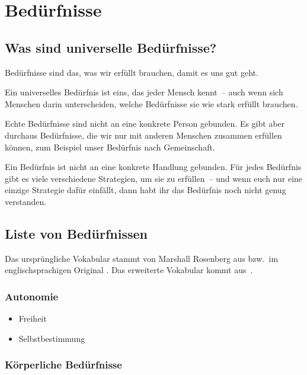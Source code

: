 \section{Bedürfnisse}
\label{beduerfnisse}

\subsection{Was sind universelle Bedürfnisse?}

Bedürfnisse sind das, was wir erfüllt brauchen, damit es uns gut geht.

Ein universelles Bedürfnis ist eins, das jeder Mensch kennt~-- auch wenn sich Menschen darin unterscheiden, welche Bedürfnisse sie wie stark erfüllt brauchen.

Echte Bedürfnisse sind nicht an eine konkrete Person gebunden. Es gibt aber durchaus Bedürfnisse, die wir nur mit anderen Menschen zusammen erfüllen können, zum Beispiel unser Bedürfnis nach Gemeinschaft.

Ein Bedürfnis ist nicht an eine konkrete Handlung gebunden. Für jedes Bedürfnis gibt es viele verschiedene Strategien, um sie zu erfüllen~-- und wenn euch nur eine einzige Strategie dafür einfällt, dann habt ihr das Bedürfnis noch nicht genug verstanden.

\subsection{Liste von Bedürfnissen}
\label{beduerfnisse-liste}

Das ursprüngliche Vokabular stammt von Marshall Rosenberg aus \cite[S.~216~f]{gfk-rosenberg} bzw.~im englischsprachigen Original \cite[S.~210]{nvc-rosenberg}. Das erweiterte Vokabular kommt aus~\cite[S.~75~f]{gfk-dummies}.


\subsubsection{Autonomie}

\begin{multicols}{2}
  \begin{itemize}
    \item Freiheit
    \item Selbstbestimmung
  \end{itemize}
\end{multicols}


\subsubsection{Körperliche Bedürfnisse}

